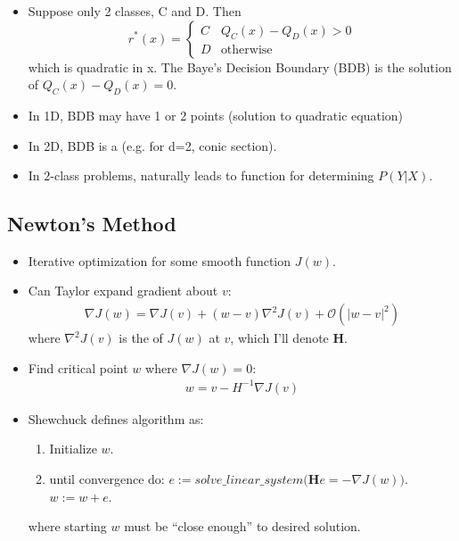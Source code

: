 \documentclass[12pt]{article}
\renewcommand{\matr}[1]{\mathbf{#1}}
\begin{document}
\subsubsection{}
\begin{itemize}
	\item Suppose only 2 classes, C and D. Then
	\begin{equation}
		r^*(x) =
		\begin{cases}
			C & Q_C(x) - Q_D(x) > 0 \\
			D & \text{otherwise}
		\end{cases}
	\end{equation}
	which is quadratic in x. The Baye's Decision Boundary (BDB) is the solution of $Q_C(x) - Q_D(x) = 0$.
	\item In 1D, BDB may have 1 or 2 points (solution to quadratic equation)
	\item In 2D, BDB is a  (e.g. for d=2, conic section).
	\item In 2-class problems, naturally leads to  function for determining $P(Y|X)$.
\end{itemize}

\subsection{Newton's Method}
\begin{itemize}
	\item Iterative optimization for some smooth function $J(w)$. 
	\item Can Taylor expand gradient about $v$:
	\begin{align}
		\nabla J(w) = \nabla J(v) + (w - v)\nabla^2 J(v) + \mathcal{O}(|w-v|^2)
	\end{align}
	where $\nabla^2 J(v) $ is the  of $J(w)$ at $v$, which I'll denote $\matr{H}$. 
	\item Find critical point $w$ where $\nabla J(w) = 0$:
	\begin{align}
		w = v - H^{-1} \nabla J(v)
	\end{align}
	\item Shewchuck defines  algorithm as:
	\begin{enumerate}
		\item Initialize $w$. 
		\item until convergence do:
		\subitem $e := solve\_linear\_system\bigg(\matr{H} e = -\nabla J(w) \bigg)$. 
		\subitem $w := w + e$. 
	\end{enumerate}
	where starting $w$ must be ``close enough'' to desired solution.
\end{itemize}
\end{document}
